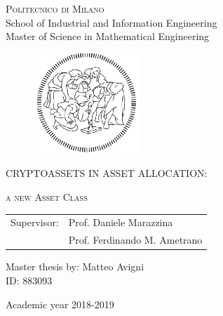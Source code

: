 \begin{titlepage}
	\begin{center}
		\normalsize 
			\textsc{Politecnico di Milano}\\
			School of Industrial and Information Engineering\\
			Master of Science in Mathematical Engineering\\

	\end{center}
	\vspace{.6cm}
	
	\begin{figure}[htpb]
		\centering
		\includegraphics[width=4cm]{Cover/polimi.eps} %
	\end{figure}
	\vspace{.6cm}
	
	\begin{center}
		\LARGE
			\textsc{CRYPTOASSETS IN ASSET ALLOCATION:}
	\end{center}
	\begin{center}
	    \fontsize{16}{11}\textsc{a new Asset Class}
	\end{center}
	\vspace{1.6cm}

	\begin{flushleft}
		\large
		\begin{tabular}{ll}
		Supervisor: & Prof.	Daniele Marazzina \\
		& Prof. Ferdinando M. Ametrano
		\end{tabular}
		\vspace{1cm}
	\end{flushleft}
	
	\begin{flushright}
		\large
		Master thesis by:
		Matteo Avigni\\
		ID: 883093\\		
	\end{flushright}
	
	\vspace*{\fill}
	\begin{center}
		Academic year 2018-2019
	\end{center}
	
\end{titlepage}
